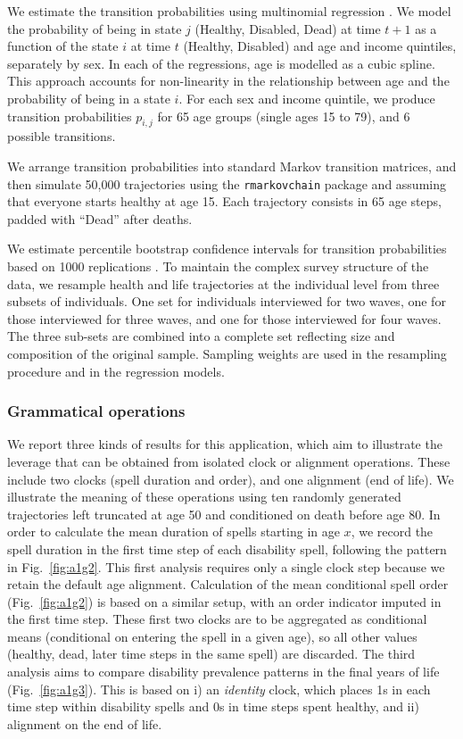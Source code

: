 \documentclass[a4paper,left=1.25cm,right=1.25cm,top=1.25cm,bottom=1.25cm]{article}
\begin{document}
We estimate the transition probabilities using multinomial regression \citep{Allison1982}. We model the probability of being in state $j$ (Healthy, Disabled, Dead) at time $t + 1$ as a function of the state $i$ at time $t$ (Healthy, Disabled) and age and income quintiles, separately by sex. In each of the regressions, age is modelled as a cubic spline. This approach accounts for non-linearity in the relationship between age and the probability of being in a state $i$. For each sex and income quintile, we produce transition probabilities $p_{i,j}$ for 65 age groups (single ages 15 to 79), and 6 possible transitions.

We arrange transition probabilities into standard Markov transition matrices, and then simulate 50,000 trajectories using the \texttt{rmarkovchain} package \citep{spedicato2017} and assuming that everyone starts healthy at age 15. Each trajectory consists in 65 age steps, padded with ``Dead'' after deaths. 

We estimate percentile bootstrap confidence intervals for transition probabilities based on 1000 replications \citep{Cameron2005}.
To maintain the complex survey structure of the data, we resample health and life trajectories at the individual level from three subsets of individuals. One set for individuals interviewed for two waves, one for those interviewed for three waves, and one for those interviewed for four waves. The three sub-sets are combined into a complete set reflecting size and composition of the original sample. Sampling weights are used in the resampling procedure and in the regression models. 

\subsubsection{Grammatical operations}
We report three kinds of results for this application, which aim to illustrate the leverage that can be obtained from isolated clock or alignment operations. These include two clocks (spell duration and order), and one alignment (end of life). We illustrate the meaning of these operations using ten randomly generated trajectories left truncated at age 50 and conditioned on death before age 80. In order to calculate the mean duration of spells starting in age $x$, we record the spell duration in the first time step of each disability spell, following the pattern in Fig.~\ref{fig:a1g2}. This first analysis requires only a single clock step because we retain the default age alignment. Calculation of the mean conditional spell order (Fig.~\ref{fig:a1g2}) is based on a similar setup, with an order indicator imputed in the first time step. These first two clocks are to be aggregated as conditional means (conditional on entering the spell in a given age), so all other values (healthy, dead, later time steps in the same spell) are discarded. The third analysis aims to compare disability prevalence patterns in the final years of life (Fig.~\ref{fig:a1g3}). This is based on i) an \emph{identity} clock, which places 1s in each time step within disability spells and 0s in time steps spent healthy, and ii) alignment on the end of life.
\end{document}
